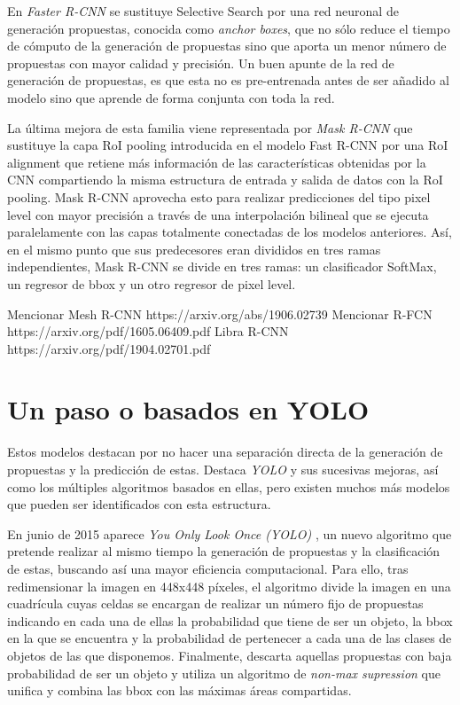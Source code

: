 En \emph{Faster R-CNN} \cite{2015arXiv150601497R} se sustituye Selective Search por una red neuronal de generación propuestas, conocida como \emph{anchor boxes}, que no sólo reduce el tiempo de cómputo de la generación de propuestas sino que aporta un menor número de propuestas con mayor calidad y precisión. Un buen apunte de la red de generación de propuestas, es que esta no es pre-entrenada antes de ser añadido al modelo sino que aprende de forma conjunta con toda la red.\newline

La última mejora de esta familia viene representada por \emph{Mask R-CNN} \cite{2017arXiv170306870H} que sustituye la capa RoI pooling introducida en el modelo Fast R-CNN por una RoI alignment que retiene más información de las características obtenidas por la CNN compartiendo la misma estructura de entrada y salida de datos con la RoI pooling. Mask R-CNN aprovecha esto para realizar predicciones del tipo pixel level con mayor precisión a través de una interpolación bilineal que se ejecuta paralelamente con las capas totalmente conectadas de los modelos anteriores. Así, en el mismo punto que sus predecesores eran divididos en tres ramas independientes, Mask R-CNN se divide en tres ramas: un clasificador SoftMax, un regresor de bbox y un otro regresor de pixel level.\newline

Mencionar Mesh R-CNN
https://arxiv.org/abs/1906.02739\newline
Mencionar R-FCN
https://arxiv.org/pdf/1605.06409.pdf\newline
Libra R-CNN
https://arxiv.org/pdf/1904.02701.pdf
\section{Un paso o basados en YOLO}
Estos modelos destacan por no hacer una separación directa de la generación de propuestas y la predicción de estas. Destaca \emph{YOLO} y sus sucesivas mejoras, así como los múltiples algoritmos basados en ellas, pero existen muchos más modelos que pueden ser identificados con esta estructura.\newline

En junio de 2015 aparece \emph{You Only Look Once (YOLO)} \cite{2015arXiv150602640R}, un nuevo algoritmo que pretende realizar al mismo tiempo la generación de propuestas y la clasificación de estas, buscando así una mayor eficiencia computacional. Para ello, tras redimensionar la imagen en 448x448 píxeles, el algoritmo divide la imagen en una cuadrícula cuyas celdas se encargan de realizar un número fijo de propuestas indicando en cada una de ellas la probabilidad que tiene de ser un objeto, la bbox en la que se encuentra y la probabilidad de pertenecer a cada una de las clases de objetos de las que disponemos. Finalmente, descarta aquellas propuestas con baja probabilidad de ser un objeto y utiliza un algoritmo de \emph{non-max supression} \cite{2017arXiv170404503B} que unifica y combina las bbox con las máximas áreas compartidas.\newline


